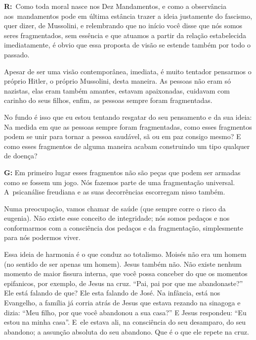  

\textbf{R:}~Como toda moral nasce nos Dez Mandamentos, e como a
observância aos\textbf{}~mandamentos pode em última estância trazer a
ideia justamente do fascismo, quer dizer, de Mussolini, e relembrando
que no início você disse que nós somos seres fragmentados, sem essência
e que atuamos a partir da relação estabelecida imediatamente, é obvio
que essa proposta de visão se estende também por todo o passado.

 

Apesar de ser uma visão contemporânea, imediata, é muito tentador
pensarmos o próprio Hitler, o próprio Mussolini, desta maneira. As
pessoas não eram só nazistas, elas eram também amantes, estavam
apaixonadas, cuidavam com carinho do seus filhos, enfim, as pessoas
sempre foram fragmentadas.

 

No fundo é isso que eu estou tentando resgatar do seu pensamento e da
sua ideia: Na medida em que as pessoas sempre foram fragmentadas, como
esses fragmentos podem se unir para tornar a pessoa saudável, sã ou em
paz consigo mesmo? E como esses fragmentos de alguma maneira acabam
construindo um tipo qualquer de doença?

 

\textbf{G:} Em primeiro lugar esses fragmentos não são peças que podem
ser armadas como se fossem um jogo. Nós fazemos parte de uma
fragmentação universal. A~psicanálise freudiana e as suas decorrências
escorregam nisso também.

 

Numa preocupação, vamos chamar de saúde (que sempre corre o risco da
eugenia). Não existe esse conceito de integridade; nós somos pedaços e
nos conformarmos com a consciência dos pedaços e da fragmentação,
simplesmente para nós podermos viver.

 

Essa ideia de harmonia é o que conduz ao totalismo. Moisés não era um
homem (no sentido de ser apenas um homem). Jesus também não. Não existe
nenhum momento de maior fissura interna, que você possa conceber do que
os momentos epifanicos, por exemplo, de Jesus na cruz. ``Pai, pai por
que me abandonaste?'' Ele está falando de que? Ele esta falando de José.
Na infância, está nos Evangelho, a família já corria atrás de Jesus que
estava rezando na sinagoga e dizia: ``Meu filho, por que você abandonou
a sua casa?'' E Jesus respondeu: ``Eu estou na minha casa''. E~ele
estava ali, na consciência do seu desamparo, do seu abandono; a assunção
absoluta do seu abandono. Que é o que ele repete na cruz.

